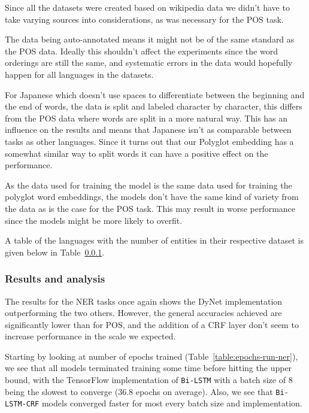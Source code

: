Since all the datasets were created based on wikipedia data we didn't have to
take varying sources into considerations, as was necessary for the POS task.

The data being auto-annotated means it might not be of the same standard as the
POS data. Ideally this shouldn't affect the experiments since the word orderings
are still the same, and systematic errors in the data would hopefully happen for
all languages in the datasets.

For Japanese which doesn't use spaces to differentiate between the beginning and
the end of words, the data is split and labeled character by character, this
differs from the POS data where words are split in a more natural way. This has
an influence on the results and means that Japanese isn't as comparable between
tasks as other languages. Since it turns out that our Polyglot embedding has a
somewhat similar way to split words it can have a positive effect on the
performance.

As the data used for training the model is the same data used for training the
polyglot word embeddings, the models don't have the same kind of variety from
the data as is the case for the POS task. This may result in worse performance
since the models might be more likely to overfit.

A table of the languages with the number of entities in their respective dataset
is given below in Table~\ref{}.

\subsubsection{Results and analysis}

The results for the NER tasks once again shows the DyNet implementation
outperforming the two others. However, the general accuracies achieved are
significantly lower than for POS, and the addition of a CRF layer don't seem to
increase performance in the scale we expected.

Starting by looking at number of epochs trained
(Table~\ref{table:epochs-run-ner}), we see that all models terminated training
some time before hitting the upper bound, with the TensorFlow implementation of
\texttt{Bi-LSTM} with a batch size of 8 being the slowest to converge (36.8
epochs on average). Also, we see that \texttt{Bi-LSTM-CRF} models converged
faster for most every batch size and implementation.

